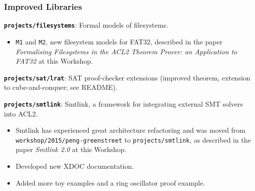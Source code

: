 \documentclass{beamer}
\newcommand{\code}[1]{\texttt{#1}}
\newcommand{\bookpath}[1]{\textbf{\code{#1}}}
\newcommand{\implibtitle}{\frametitle{Improved Libraries}}
\newcommand{\separation}{\vspace*{1ex}}
\begin{document}
\begin{frame}

\implibtitle

\bookpath{projects/filesystems}:
Formal models of filesystems.
\begin{itemize}
\item
\texttt{M1} and \texttt{M2}, new filesystem models for FAT32,
described in the paper
\textit{Formalising Filesystems in the ACL2 Theorem Prover:
an Application to FAT32}
at this Workshop.
\end{itemize}

\separation

\bookpath{projects/sat/lrat}:
SAT proof-checker extensions (improved theorem, extension to
cube-and-conquer; see README).

\separation

\bookpath{projects/smtlink}:
Smtlink, a framework for integrating external SMT solvers into ACL2.
\begin{itemize}
\item
Smtlink has experienced great architecture refactoring and was moved from
\code{workshop/2015/peng-greenstreet} to \code{projects/smtlink},
as described in the paper \textit{Smtlink 2.0} at this Workshop.
\item
Developed new XDOC documentation.
\item
Added more toy examples and a ring oscillator proof example.
\end{itemize}

\end{frame}

\end{document}
